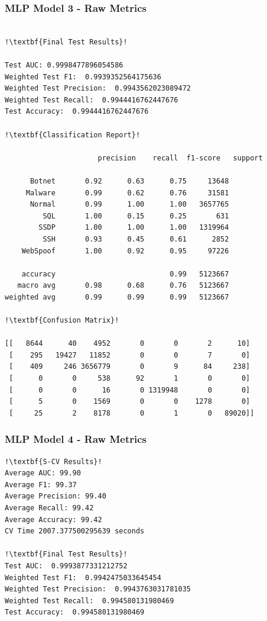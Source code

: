 \begin{appendices}
\subsubsection{MLP Model 3 - Raw Metrics}
\begin{lstlisting}[escapechar=!]

!\textbf{Final Test Results}!

Test AUC: 0.9998477896054586
Weighted Test F1:  0.9939352564175636
Weighted Test Precision:  0.9943562023089472
Weighted Test Recall:  0.9944416762447676
Test Accuracy:  0.9944416762447676

!\textbf{Classification Report}!

			          precision    recall  f1-score   support

      Botnet       0.92      0.63      0.75     13648
     Malware       0.99      0.62      0.76     31581
      Normal       0.99      1.00      1.00   3657765
         SQL       1.00      0.15      0.25       631
        SSDP       1.00      1.00      1.00   1319964
         SSH       0.93      0.45      0.61      2852
    WebSpoof       1.00      0.92      0.95     97226

    accuracy                           0.99   5123667
   macro avg       0.98      0.68      0.76   5123667
weighted avg       0.99      0.99      0.99   5123667
    
!\textbf{Confusion Matrix}! 
   
[[   8644      40    4952       0       0       2      10]
 [    295   19427   11852       0       0       7       0]
 [    409     246 3656779       0       9      84     238]
 [      0       0     538      92       1       0       0]
 [      0       0      16       0 1319948       0       0]
 [      5       0    1569       0       0    1278       0]
 [     25       2    8178       0       1       0   89020]]

\end{lstlisting}


\subsubsection{MLP Model 4 - Raw Metrics}
\begin{lstlisting}[escapechar=!]
!\textbf{S-CV Results}!
Average AUC: 99.90
Average F1: 99.37
Average Precision: 99.40
Average Recall: 99.42
Average Accuracy: 99.42
CV Time 2007.377500295639 seconds

!\textbf{Final Test Results}!
Test AUC:  0.9993877331212752
Weighted Test F1:  0.9942475033645454
Weighted Test Precision:  0.9943763031781035
Weighted Test Recall:  0.994580131980469
Test Accuracy:  0.994580131980469


\end{lstlisting}
\end{appendices}

